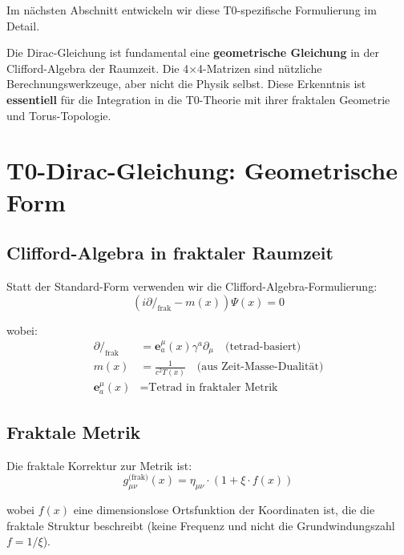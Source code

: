 Im nächsten Abschnitt entwickeln wir diese T0-spezifische Formulierung im Detail.

\begin{keypoint}
	Die Dirac-Gleichung ist fundamental eine \textbf{geometrische Gleichung} in der 
	Clifford-Algebra der Raumzeit. Die 4×4-Matrizen sind nützliche 
	Berechnungswerkzeuge, aber nicht die Physik selbst. Diese Erkenntnis ist 
	\textbf{essentiell} für die Integration in die T0-Theorie mit ihrer fraktalen 
	Geometrie und Torus-Topologie.
\end{keypoint}	
	\section{T0-Dirac-Gleichung: Geometrische Form}
	
	\subsection{Clifford-Algebra in fraktaler Raumzeit}
	
	Statt der Standard-Form verwenden wir die Clifford-Algebra-Formulierung:
	\begin{equation}
		\boxed{(i \partial\!\!\!/_{\text{frak}} - m(x))\Psi(x) = 0}
		\label{eq:t0_dirac}
	\end{equation}
	
	wobei:
	\begin{align}
		\partial\!\!\!/_{\text{frak}} &= \mathbf{e}^\mu_a(x) \gamma^a \partial_\mu 
		\quad \text{(tetrad-basiert)} \\
		m(x) &= \frac{1}{c^2 T(x)} \quad \text{(aus Zeit-Masse-Dualität)} \\
		\mathbf{e}^\mu_a(x) &= \text{Tetrad in fraktaler Metrik}
	\end{align}
	
	\subsection{Fraktale Metrik}
	
	Die fraktale Korrektur zur Metrik ist:
	\begin{equation}
		g_{\mu\nu}^{\text{(frak)}}(x) = \eta_{\mu\nu} \cdot \left(1 + \xi \cdot f(x)\right)
		\label{eq:fractal_metric}
	\end{equation}

	wobei $f(x)$ eine dimensionslose Ortsfunktion der Koordinaten ist, die die fraktale 
	Struktur beschreibt (keine Frequenz und nicht die Grundwindungszahl $f = 1/\xi$).
	
